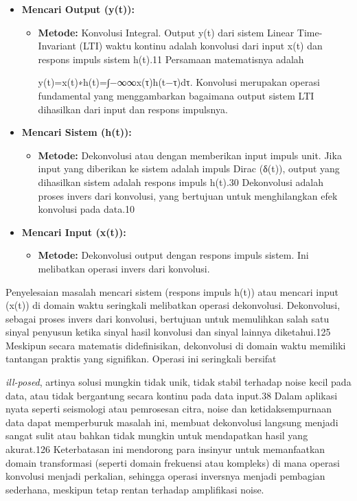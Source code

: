 \documentclass[
  letterpaper,
  DIV=11,
  numbers=noendperiod]{scrreprt}
\providecommand{\tightlist}{%
  \setlength{\itemsep}{0pt}\setlength{\parskip}{0pt}}\usepackage{longtable,booktabs,array}
\begin{document}
\begin{itemize}
\item
  \textbf{Mencari Output (y(t)):}

  \begin{itemize}
  \item
    \textbf{Metode:} Konvolusi Integral. Output y(t) dari sistem Linear
    Time-Invariant (LTI) waktu kontinu adalah konvolusi dari input x(t)
    dan respons impuls sistem h(t).11 Persamaan matematisnya adalah

    y(t)=x(t)∗h(t)=∫−∞∞\hspace{0pt}x(τ)h(t−τ)dτ. Konvolusi merupakan
    operasi fundamental yang menggambarkan bagaimana output sistem LTI
    dihasilkan dari input dan respons impulsnya.
  \end{itemize}
\item
  \textbf{Mencari Sistem (h(t)):}

  \begin{itemize}
  \tightlist
  \item
    \textbf{Metode:} Dekonvolusi atau dengan memberikan input impuls
    unit. Jika input yang diberikan ke sistem adalah impuls Dirac
    (δ(t)), output yang dihasilkan sistem adalah respons impuls h(t).30
    Dekonvolusi adalah proses invers dari konvolusi, yang bertujuan
    untuk menghilangkan efek konvolusi pada data.10
  \end{itemize}
\item
  \textbf{Mencari Input (x(t)):}

  \begin{itemize}
  \tightlist
  \item
    \textbf{Metode:} Dekonvolusi output dengan respons impuls sistem.
    Ini melibatkan operasi invers dari konvolusi.
  \end{itemize}
\end{itemize}

Penyelesaian masalah mencari sistem (respons impuls h(t)) atau mencari
input (x(t)) di domain waktu seringkali melibatkan operasi dekonvolusi.
Dekonvolusi, sebagai proses invers dari konvolusi, bertujuan untuk
memulihkan salah satu sinyal penyusun ketika sinyal hasil konvolusi dan
sinyal lainnya diketahui.125 Meskipun secara matematis didefinisikan,
dekonvolusi di domain waktu memiliki tantangan praktis yang signifikan.
Operasi ini seringkali bersifat

\emph{ill-posed}, artinya solusi mungkin tidak unik, tidak stabil
terhadap noise kecil pada data, atau tidak bergantung secara kontinu
pada data input.38 Dalam aplikasi nyata seperti seismologi atau
pemrosesan citra, noise dan ketidaksempurnaan data dapat memperburuk
masalah ini, membuat dekonvolusi langsung menjadi sangat sulit atau
bahkan tidak mungkin untuk mendapatkan hasil yang akurat.126
Keterbatasan ini mendorong para insinyur untuk memanfaatkan domain
transformasi (seperti domain frekuensi atau kompleks) di mana operasi
konvolusi menjadi perkalian, sehingga operasi inversnya menjadi
pembagian sederhana, meskipun tetap rentan terhadap amplifikasi noise.
\end{document}
